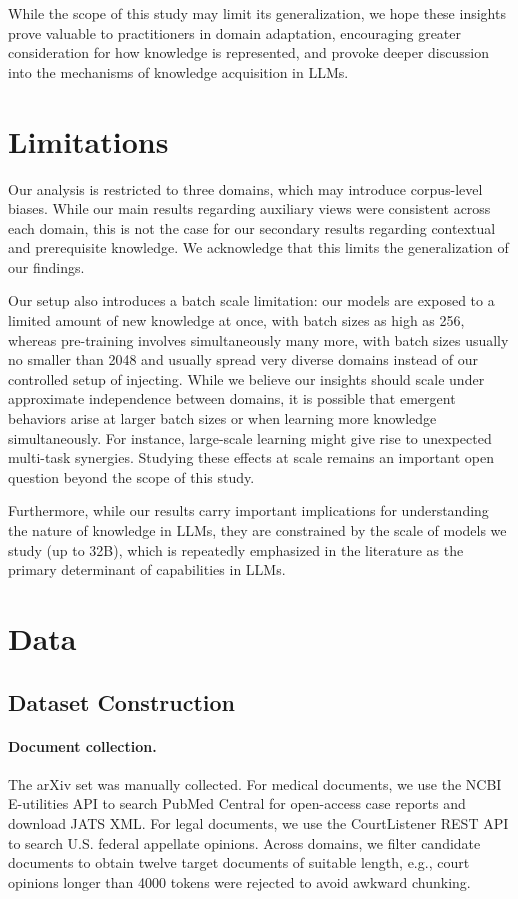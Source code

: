 \documentclass[11pt]{article}
\begin{document}
While the scope of this study may limit its generalization, we hope these insights prove valuable to practitioners in domain adaptation, encouraging greater consideration for how knowledge is represented, and provoke deeper discussion into the mechanisms of knowledge acquisition in LLMs.

\section*{Limitations}

Our analysis is restricted to three domains, which may introduce corpus-level biases. While our main results regarding auxiliary views were consistent across each domain, this is not the case for our secondary results regarding contextual and prerequisite knowledge. We acknowledge that this limits the generalization of our findings.

Our setup also introduces a batch scale limitation: our models are exposed to a limited amount of new knowledge at once, with batch sizes as high as 256, whereas pre-training involves simultaneously many more, with batch sizes usually no smaller than 2048 and usually spread very diverse domains instead of our controlled setup of injecting. While we believe our insights should scale under approximate independence between domains, it is possible that emergent behaviors arise at larger batch sizes or when learning more knowledge simultaneously. For instance, large-scale learning might give rise to unexpected multi-task synergies. Studying these effects at scale remains an important open question beyond the scope of this study. 

Furthermore, while our results carry important implications for understanding the nature of knowledge in LLMs, they are constrained by the scale of models we study (up to 32B), which is repeatedly emphasized in the literature as the primary determinant of capabilities in LLMs.



\appendix
\section{Data}
\label{Appendix:preprocess}

\subsection{Dataset Construction}

\paragraph{Document collection.} The arXiv set was manually collected.  For medical documents, we use the NCBI E-utilities API to search PubMed Central for open-access case reports and download JATS XML.  For legal documents, we use the CourtListener REST API to search U.S. federal appellate opinions. Across domains, we filter candidate documents to obtain twelve target documents of suitable length, e.g., court opinions longer than 4000 tokens were rejected to avoid awkward chunking.
\end{document}

